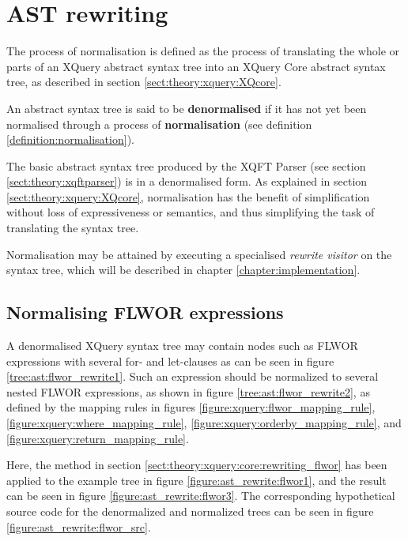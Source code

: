 \section{AST rewriting}
\label{sect:method:ast_rewrite}
\begin{myDefinition}
\label{definition:normalisation}
The process of normalisation is defined as the process of translating the
whole or parts of an XQuery abstract syntax tree into an XQuery Core abstract
syntax tree, as described in section \ref{sect:theory:xquery:XQcore}.
\end{myDefinition}

\begin{myDefinition}
\label{definition:denormalised}
An abstract syntax tree is said to be \textbf{denormalised} if it has not yet
been normalised through a process of \textbf{normalisation} (see definition
\ref{definition:normalisation}).
\end{myDefinition}

The basic abstract syntax tree produced by the XQFT Parser (see section
\ref{sect:theory:xqftparser}) is in a denormalised form. As explained in
section \ref{sect:theory:xquery:XQcore}, normalisation has the benefit of
simplification without loss of expressiveness or semantics, and thus simplifying
the task of translating the syntax tree.

Normalisation may be attained by executing a specialised \textit{rewrite
visitor} on the syntax tree, which will be described in chapter
\ref{chapter:implementation}.

\subsection{Normalising FLWOR expressions}
A denormalised XQuery syntax tree may contain nodes such as FLWOR expressions
 with several for- and let-clauses as can be seen in figure \ref{tree:ast:flwor_rewrite1}. Such an
expression should be normalized to several nested FLWOR expressions, as shown
in figure \ref{tree:ast:flwor_rewrite2}, as defined by the mapping rules in
figures \ref{figure:xquery:flwor_mapping_rule},
\ref{figure:xquery:where_mapping_rule},
\ref{figure:xquery:orderby_mapping_rule}, and
\ref{figure:xquery:return_mapping_rule}.

Here, the method in section \ref{sect:theory:xquery:core:rewriting_flwor} has
been applied to the example tree in figure \ref{figure:ast_rewrite:flwor1},
and the result can be seen in figure \ref{figure:ast_rewrite:flwor3}. The
corresponding hypothetical source code for the denormalized and normalized trees
can be seen in figure \ref{figure:ast_rewrite:flwor_src}.

